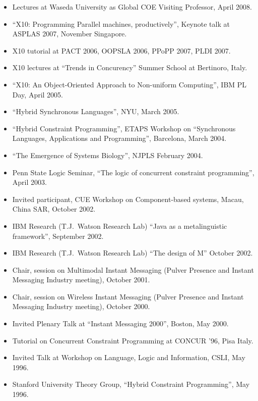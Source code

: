 \documentclass{article}
\begin{document}
\begin{itemize}
\item Lectures at Waseda University as Global COE Visiting Professor,
April 2008.
\item ``X10: Programming Parallel machines, productively'', Keynote
talk at ASPLAS 2007, November Singapore.
\item X10 tutorial at PACT 2006, OOPSLA 2006, PPoPP 2007, PLDI 2007.
\item X10 lectures at ``Trends in Concurency'' Summer School at
Bertinoro, Italy.
\item ``X10: An Object-Oriented Approach to Non-uniform Computing'',
IBM PL Day, April 2005.
\item ``Hybrid Synchronous Languages'', NYU, March 2005.
\item ``Hybrid Constraint Programming'', ETAPS Workshop on
``Synchronous Languages, Applications and Programming'', Barcelona,
March 2004.
\item ``The Emergence of Systems Biology'', NJPLS February 2004.
\item 
Penn State Logic Seminar, ``The logic of concurrent constraint
programming'', April 2003.
\item 
Invited participant, CUE Workshop on Component-based systems, Macau,
China SAR, October 2002.
\item IBM Research (T.J.~Watson Research Lab) ``Java as a metalinguistic
framework'', September 2002.
\item 
IBM Research (T.J.~Watson Research Lab) ``The design of M''
October 2002.
\item
Chair, session on Multimodal Instant Messaging (Pulver Presence and
Instant Messaging Industry meeting), October 2001.

\item
Chair, session on Wireless Instant Messaging (Pulver Presence and
Instant Messaging Industry meeting), October 2000.

\item Invited Plenary Talk at ``Instant Messaging 2000'', Boston, May
    2000.

\item Tutorial on Concurrent Constraint Programming at CONCUR
    '96, Pisa Italy.

 \item Invited Talk at Workshop on Language, Logic and
    Information, CSLI, May 1996.

 \item Stanford University Theory Group, ``Hybrid Constraint
    Programming'', May 1996. 


\end{itemize}
\end{document}
